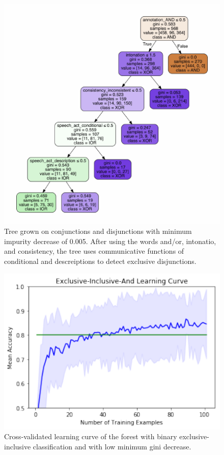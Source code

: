 \documentclass[oneside]{report}
\theoremstyle{definition}
\theoremstyle{definition}
\theoremstyle{definition}
\theoremstyle{remark}
\begin{document}
\begin{figure}
\centering
\includegraphics{figs/ternaryHighFeatures-1.pdf}
\caption{\label{fig:ternaryHighFeatures}Tree grown on conjunctions and
disjunctions with minimum impurity decrease of 0.005. After using the
words and/or, intonatio, and consistency, the tree uses communicative
functions of conditional and descreiptions to detect exclusive
disjunctions.}
\end{figure}
\begin{figure}
\centering
\includegraphics{figs/ternaryCurve-1.pdf}
\caption{\label{fig:ternaryCurve}Cross-validated learning curve of the
forest with binary exclusive-inclusive classification and with low
minimum gini decrease.}
\end{figure}
\end{document}
